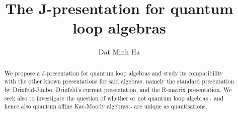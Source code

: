 

\setcounter{section}{-1}





    \title{The J-presentation for quantum loop algebras}
    
    \author{Dat Minh Ha}
    \maketitle
    
    \begin{abstract}
        We propose a J-presentation for quantum loop algebras and study its compatibility with the other known presentations for said algebras, namely the standard presentation by Drinfeld-Jimbo, Drinfeld's current presentation, and the R-matrix presentation. We seek also to investigate the question of whether or not quantum loop algebras - and hence also quantum affine Kac-Moody algebras - are unique as quantisations.  
    \end{abstract}
    
    {
    \hypersetup{} 
    \tableofcontents %
    }

    

    

    
    
    \printbibliography

